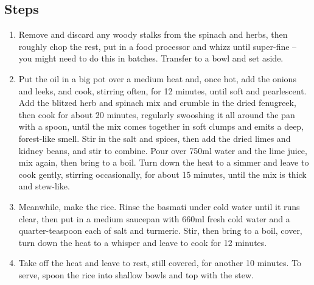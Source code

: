 \documentclass{book}
\begin{document}
\subsection*{Steps}
\begin{enumerate}
\item Remove and discard any woody stalks from the spinach and herbs, then roughly chop the rest, put in a food processor and whizz until super-fine – you might need to do this in batches. Transfer to a bowl and set aside.
\item Put the oil in a big pot over a medium heat and, once hot, add the onions and leeks, and cook, stirring often, for 12 minutes, until soft and pearlescent. Add the blitzed herb and spinach mix and crumble in the dried fenugreek, then cook for about 20 minutes, regularly swooshing it all around the pan with a spoon, until the mix comes together in soft clumps and emits a deep, forest-like smell. Stir in the salt and spices, then add the dried limes and kidney beans, and stir to combine. Pour over 750ml water and the lime juice, mix again, then bring to a boil. Turn down the heat to a simmer and leave to cook gently, stirring occasionally, for about 15 minutes, until the mix is thick and stew-like.
\item Meanwhile, make the rice. Rinse the basmati under cold water until it runs clear, then put in a medium saucepan with 660ml fresh cold water and a quarter-teaspoon each of salt and turmeric. Stir, then bring to a boil, cover, turn down the heat to a whisper and leave to cook for 12 minutes.
\item Take off the heat and leave to rest, still covered, for another 10 minutes. To serve, spoon the rice into shallow bowls and top with the stew.
\end{enumerate}
\newpage
\end{document}
